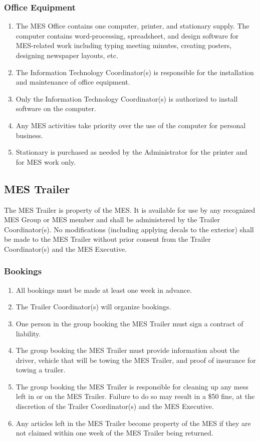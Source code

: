 \subsubsection{Office Equipment}
\label{office-equipment}
\begin{enumerate}
 \item
  The MES Office contains one computer, printer, and stationary supply. The computer contains word-processing, spreadsheet, and design software for MES-related work including typing meeting minutes, creating posters, designing newspaper layouts, etc.
 \item
  The Information Technology Coordinator(s) is responsible for the installation and maintenance of office equipment.
 \item
  Only the Information Technology Coordinator(s) is authorized to install software on the computer.
 \item
  Any MES activities take priority over the use of the computer for personal business.
 \item
  Stationary is purchased as needed by the Administrator for the printer and for MES work only.

\end{enumerate}

\subsection{MES Trailer}
\label{mes-trailer}
The MES Trailer is property of the MES. It is available for use by any
recognized MES Group or MES member and shall be administered by the
Trailer Coordinator(s). No modifications (including applying decals to
the exterior) shall be made to the MES Trailer without prior consent
from the Trailer Coordinator(s) and the MES Executive.

\subsubsection{Bookings}
\label{bookings}

\begin{enumerate}
 \item
  All bookings must be made at least one week in advance.
 \item
  The Trailer Coordinator(s) will organize bookings.
 \item
  One person in the group booking the MES Trailer must sign a contract of liability.
 \item
  The group booking the MES Trailer must provide information about the driver, vehicle that will be towing the MES Trailer, and proof of insurance for towing a trailer.
 \item
  The group booking the MES Trailer is responsible for cleaning up any mess left in or on the MES Trailer. Failure to do so may result in a \$50 fine, at the discretion of the Trailer Coordinator(s) and the MES Executive.
 \item
  Any articles left in the MES Trailer become property of the MES if they are not claimed within one week of the MES Trailer being returned.

\end{enumerate}

